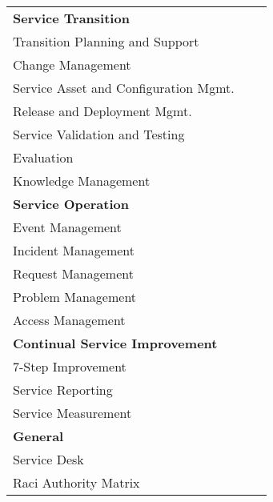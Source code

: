\begin{table}[h!]
\begin{tabular}{|p{6.1cm}|p{4.5cm}|p{4.5cm}|}
\textbf{Service Transition}          &                                &\\
Transition Planning and Support                   &                                &\\
Change Management                   &                                &\\
Service Asset and Configuration Mgmt.                   &                                &\\
Release and Deployment Mgmt.                   &                                &\\
Service Validation and Testing                   &                                &\\
Evaluation                   &                                &\\
Knowledge Management                   &                                &\\\hline
\textbf{Service Operation}          &                                &\\
Event Management                   &                                &\\
Incident Management                   &                                &\\
Request Management                   &                                &\\
Problem Management                   &                                &\\
Access Management                   &                                &\\\hline
\textbf{Continual Service Improvement}          &                                &\\
7-Step Improvement                   &                                &\\
Service Reporting                   &                                &\\
Service Measurement                 &                                &\\\hline
\textbf{General}                   &                                 &\\
Service Desk                       &                                 &\\
Raci Authority Matrix                    &                           &\\\hline
\end{tabular}
\label{tab:SupportedITSMProcesses}
\end{table}


